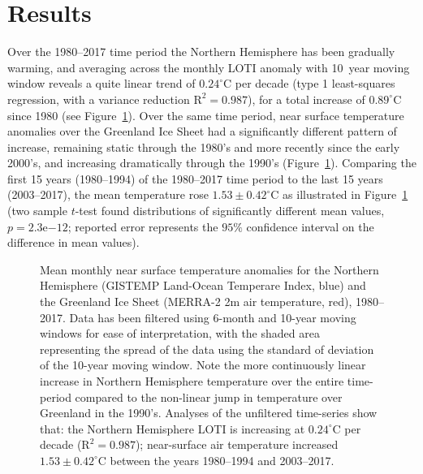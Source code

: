 \documentclass[11pt]{report}
\begin{document}
 \section{Results}
 Over the 1980--2017 time period the Northern Hemisphere has been gradually warming, and averaging across the monthly LOTI anomaly with 10~year moving window reveals a quite linear trend of $0.24^{\circ}$C per decade (type 1 least-squares regression, with a variance reduction $\mathrm{R^2}=0.987$), for a total increase of $0.89^{\circ}$C since 1980 (see Figure~\ref{fig:climatewarming}). Over the same time period, near surface temperature anomalies over the Greenland Ice Sheet had a significantly different pattern of increase, remaining static through the 1980's and more recently since the early 2000's, and increasing dramatically through the 1990's (Figure~\ref{fig:climatewarming}). Comparing the first 15 years (1980--1994) of the 1980--2017 time period to the last 15 years (2003--2017), the mean temperature rose $1.53\pm0.42^{\circ}$C as illustrated in Figure~\ref{fig:climatewarming} (two sample $t$-test found distributions of significantly different mean values, $p = 2.3\mathrm{e}{-12}$; reported error represents the $95\%$ confidence interval on the difference in mean values). 
 
 \begin{figure}[h]
\centering
{}
\caption[Near surface warming of the Northern Hemisphere and Greenland Ice Sheet]{Mean monthly near surface temperature anomalies for the Northern Hemisphere (GISTEMP Land-Ocean Temperare Index, blue) and the Greenland Ice Sheet (MERRA-2 2m air temperature, red), 1980--2017. Data has been filtered using 6-month and 10-year moving windows for ease of interpretation, with the shaded area representing the spread of the data using the standard of deviation of the 10-year moving window. Note the more continuously linear increase in Northern Hemisphere temperature over the entire time-period compared to the non-linear jump in temperature over Greenland in the 1990's. Analyses of the unfiltered time-series show that: the Northern Hemisphere LOTI is increasing at $0.24^{\circ}$C per decade ($\mathrm{R^2}=0.987$); near-surface air temperature increased $1.53\pm0.42^{\circ}$C between the years 1980--1994 and 2003--2017.} \label{fig:climatewarming}
\end{figure}
\end{document}
